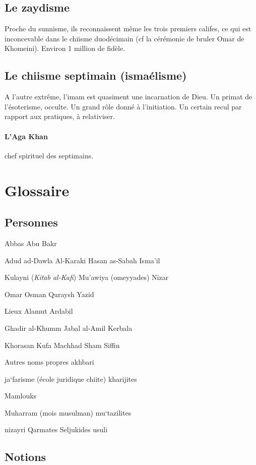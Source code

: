    \subsection{Le zaydisme}
   
   Proche du sunnisme, ils reconnaissent même les trois premiers califes, ce qui est inconcevable dans le chiisme duodécimain (cf la cérémonie de bruler Omar de Khomeini).
   Environ 1 million de fidèle.
   
   \subsection{Le chiisme septimain (ismaélisme)}
   A l'autre extrême, l'imam est quasiment une incarnation de Dieu. Un primat de l'ésoterisme, occulte. Un grand rôle donné à l'initiation. Un certain recul par rapport aux pratiques, à relativiser. 

\paragraph{L'Aga Khan} chef spirituel des septimains.
 



 
\section{Glossaire}
 
\subsection{Personnes} Abbas Abu Bakr

Adud ad-Dawla Al-Karaki Hasan as-Sabah Isma'il

Kulayni (\emph{Kitab al-Kafi}) Mu'awiya (omeyyades) Nizar

Omar Osman Quraysh Yazid

{Lieux} Alamut Ardabil

Ghadir al-Khumm Jabal al-Amil Kerbala

Khorasan Kufa Machhad Sham Siffin

{Autres noms propres} akhbari

ja`farisme (école juridique chiite) kharijites

Mamlouks

Muharram (mois musulman) mu`tazilites

nizayri Qarmates Seljukides usuli

\subsection{Notions}



